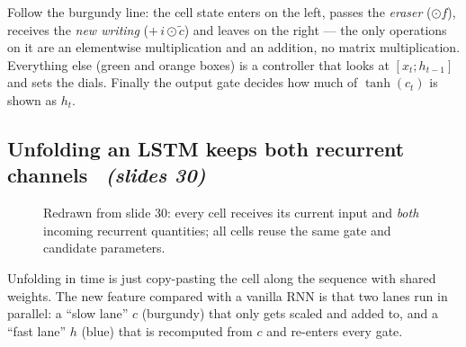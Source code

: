 \documentclass[11pt,a4paper]{article}
\newcommand{\sltag}[1]{\texorpdfstring{\ \emph{(slides #1)}}{ (slides #1)}}
\begin{document}
\begin{intuition}
Follow the burgundy line: the cell state enters on the left, passes the \emph{eraser} ($\odot f$), receives the \emph{new writing} ($+\,i\odot\tilde c$) and leaves on the right --- the only operations on it are an elementwise multiplication and an addition, no matrix multiplication. Everything else (green and orange boxes) is a controller that looks at $[x_t;h_{t-1}]$ and sets the dials. Finally the output gate decides how much of $\tanh(c_t)$ is shown as $h_t$.
\end{intuition}

\subsection{Unfolding an LSTM keeps both recurrent channels \sltag{30}}

\begin{figure}[H]\centering
{}
\caption{Redrawn from slide 30: every cell receives its current input and \emph{both} incoming recurrent quantities; all cells reuse the same gate and candidate parameters.}
\end{figure}

\begin{intuition}
Unfolding in time is just copy-pasting the cell along the sequence with shared weights. The new feature compared with a vanilla RNN is that two lanes run in parallel: a ``slow lane'' $c$ (burgundy) that only gets scaled and added to, and a ``fast lane'' $h$ (blue) that is recomputed from $c$ and re-enters every gate.
\end{intuition}
\end{document}
